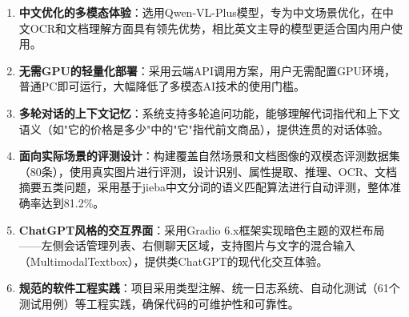 \begin{enumerate}
  \item \textbf{中文优化的多模态体验}：选用Qwen-VL-Plus模型，专为中文场景优化，在中文OCR和文档理解方面具有领先优势，相比英文主导的模型更适合国内用户使用。

  \item \textbf{无需GPU的轻量化部署}：采用云端API调用方案，用户无需配置GPU环境，普通PC即可运行，大幅降低了多模态AI技术的使用门槛。

  \item \textbf{多轮对话的上下文记忆}：系统支持多轮追问功能，能够理解代词指代和上下文语义（如"它的价格是多少"中的"它"指代前文商品），提供连贯的对话体验。

  \item \textbf{面向实际场景的评测设计}：构建覆盖自然场景和文档图像的双模态评测数据集（80条），使用真实图片进行评测，设计识别、属性提取、推理、OCR、文档摘要五类问题，采用基于jieba中文分词的语义匹配算法进行自动评测，整体准确率达到81.2\%。

  \item \textbf{ChatGPT风格的交互界面}：采用Gradio 6.x框架实现暗色主题的双栏布局——左侧会话管理列表、右侧聊天区域，支持图片与文字的混合输入（MultimodalTextbox），提供类ChatGPT的现代化交互体验。

  \item \textbf{规范的软件工程实践}：项目采用类型注解、统一日志系统、自动化测试（61个测试用例）等工程实践，确保代码的可维护性和可靠性。
\end{enumerate}